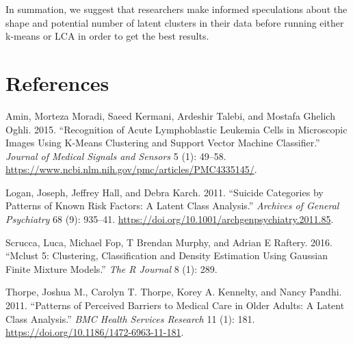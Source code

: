 \documentclass[
]{article}
\newlength{\cslhangindent}
\newlength{\cslentryspacingunit} %
\newenvironment{CSLReferences}[2] %
 {%
  \setlength{\parindent}{0pt}
  \ifodd #1
  \let\oldpar\par
  \def\par{\hangindent=\cslhangindent\oldpar}
  \fi
  \setlength{\parskip}{#2\cslentryspacingunit}
 }%
 {}
\begin{document}
In summation, we suggest that researchers make informed speculations
about the shape and potential number of latent clusters in their data
before running either k-means or LCA in order to get the best results.

\hypertarget{references}{%
\section{References}\label{references}}

\hypertarget{refs}{}
\begin{CSLReferences}{1}{0}
\leavevmode{}%
Amin, Morteza Moradi, Saeed Kermani, Ardeshir Talebi, and Mostafa
Ghelich Oghli. 2015. {``Recognition of {Acute} {Lymphoblastic}
{Leukemia} {Cells} in {Microscopic} {Images} {Using} {K}-{Means}
{Clustering} and {Support} {Vector} {Machine} {Classifier}.''}
\emph{Journal of Medical Signals and Sensors} 5 (1): 49--58.
\url{https://www.ncbi.nlm.nih.gov/pmc/articles/PMC4335145/}.

\leavevmode{}%
Logan, Joseph, Jeffrey Hall, and Debra Karch. 2011. {``Suicide
{Categories} by {Patterns} of {Known} {Risk} {Factors}: {A} {Latent}
{Class} {Analysis}.''} \emph{Archives of General Psychiatry} 68 (9):
935--41. \url{https://doi.org/10.1001/archgenpsychiatry.2011.85}.

\leavevmode{}%
Scrucca, Luca, Michael Fop, T Brendan Murphy, and Adrian E Raftery.
2016. {``Mclust 5: Clustering, Classification and Density Estimation
Using Gaussian Finite Mixture Models.''} \emph{The R Journal} 8 (1):
289.

\leavevmode{}%
Thorpe, Joshua M., Carolyn T. Thorpe, Korey A. Kennelty, and Nancy
Pandhi. 2011. {``Patterns of Perceived Barriers to Medical Care in Older
Adults: A Latent Class Analysis.''} \emph{BMC Health Services Research}
11 (1): 181. \url{https://doi.org/10.1186/1472-6963-11-181}.

\end{CSLReferences}
\end{document}

